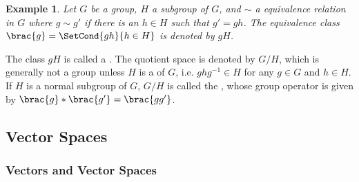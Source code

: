\documentclass[hidelinks]{article}
\newtheorem{example}{Example}
\begin{document}
\begin{sample}
    \begin{example}
        Let $G$ be a group, $H$ a subgroup of $G$, and $\sim$ a equivalence relation in $G$ where $g\sim g'$ if there is an $h\in H$ such that $g' = gh$. The equivalence class $\brac{g} = \SetCond{gh}{h\in H}$ is denoted by $gH$.
    \end{example}
\end{sample}
The class $gH$ is called a . The quotient space is denoted by $G/H$, which is generally not a group unless $H$ is a  of $G$, i.e. $ghg^{-1}\in H$ for any $g\in G$ and $h\in H$. If $H$ is a normal subgroup of $G$, $G/H$ is called the , whose group operator is given by $\brac{g}*\brac{g'} = \brac{gg'}$.



\subsection{Vector Spaces} %
\label{sub:vector_spaces}

\subsubsection{Vectors and Vector Spaces} %
\label{ssub:vectors_and_vector_spaces}
\end{document}
